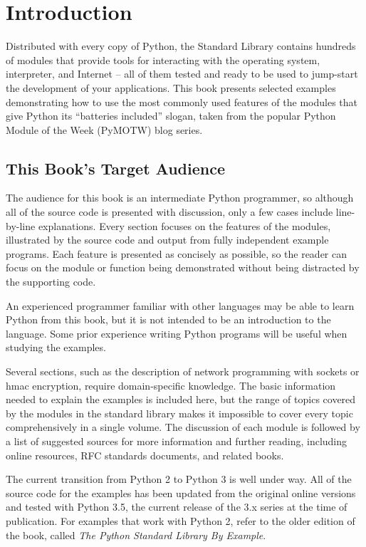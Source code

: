 \cleardoublepage
\chapter*{Introduction}

Distributed with every copy of Python, the Standard Library contains
hundreds of modules that provide tools for interacting with the
operating system, interpreter, and Internet – all of them tested and
ready to be used to jump-start the development of your
applications. This book presents selected examples demonstrating how
to use the most commonly used features of the modules that give Python
its ``batteries included'' slogan, taken from the popular Python
Module of the Week (PyMOTW) blog series.

\section*{This Book's Target Audience}

The audience for this book is an intermediate Python programmer, so
although all of the source code is presented with discussion, only a
few cases include line-by-line explanations.  Every section focuses on
the features of the modules, illustrated by the source code and output
from fully independent example programs.  Each feature is presented as
concisely as possible, so the reader can focus on the module or
function being demonstrated without being distracted by the supporting
code.

An experienced programmer familiar with other languages may be able to
learn Python from this book, but it is not intended to be an
introduction to the language.  Some prior experience writing Python
programs will be useful when studying the examples.

Several sections, such as the description of network programming with
sockets or hmac encryption, require domain-specific knowledge.  The
basic information needed to explain the examples is included here, but
the range of topics covered by the modules in the standard library
makes it impossible to cover every topic comprehensively in a single
volume.  The discussion of each module is followed by a list of
suggested sources for more information and further reading, including
online resources, RFC standards documents, and related books.

The current transition from Python 2 to Python 3 is well under way.
All of the source code for the examples has been updated from the
original online versions and tested with Python 3.5, the current
release of the 3.x series at the time of publication. For examples
that work with Python 2, refer to the older edition of the book,
called \textit{The Python Standard Library By Example}.

